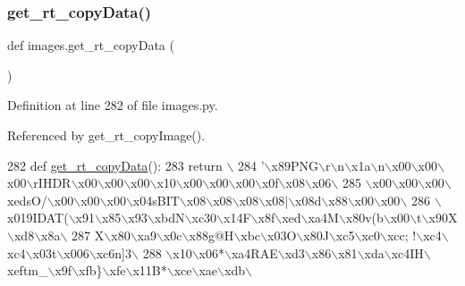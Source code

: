 \subsubsection{\texorpdfstring{get\+\_\+rt\+\_\+copy\+Data()}{get\_rt\_copyData()}}
{\footnotesize\ttfamily def images.\+get\+\_\+rt\+\_\+copy\+Data (\begin{DoxyParamCaption}{ }\end{DoxyParamCaption})}



Definition at line 282 of file images.\+py.



Referenced by get\+\_\+rt\+\_\+copy\+Image().


\begin{DoxyCode}
282 \textcolor{keyword}{def }\hyperlink{namespaceimages_ab5eacef04318a348f0c9e295ce5f6a64}{get\_rt\_copyData}():
283     \textcolor{keywordflow}{return} \(\backslash\)
284 \textcolor{stringliteral}{'\(\backslash\)x89PNG\(\backslash\)r\(\backslash\)n\(\backslash\)x1a\(\backslash\)n\(\backslash\)x00\(\backslash\)x00\(\backslash\)x00\(\backslash\)rIHDR\(\backslash\)x00\(\backslash\)x00\(\backslash\)x00\(\backslash\)x10\(\backslash\)x00\(\backslash\)x00\(\backslash\)x00\(\backslash\)x0f\(\backslash\)x08\(\backslash\)x06\(\backslash\)}
285 \textcolor{stringliteral}{\(\backslash\)x00\(\backslash\)x00\(\backslash\)x00\(\backslash\)xedsO/\(\backslash\)x00\(\backslash\)x00\(\backslash\)x00\(\backslash\)x04sBIT\(\backslash\)x08\(\backslash\)x08\(\backslash\)x08\(\backslash\)x08|\(\backslash\)x08d\(\backslash\)x88\(\backslash\)x00\(\backslash\)x00\(\backslash\)}
286 \textcolor{stringliteral}{\(\backslash\)x019IDAT(\(\backslash\)x91\(\backslash\)x85\(\backslash\)x93\(\backslash\)xbdN\(\backslash\)xc30\(\backslash\)x14F\(\backslash\)x8f\(\backslash\)xed\(\backslash\)xa4M\(\backslash\)x80v(b\(\backslash\)x00\(\backslash\)t\(\backslash\)x90X\(\backslash\)xd8\(\backslash\)x8a\(\backslash\)}
287 \textcolor{stringliteral}{X\(\backslash\)x80\(\backslash\)xa9\(\backslash\)x0c\(\backslash\)x88g@H\(\backslash\)xbc\(\backslash\)x03O\(\backslash\)x80J\(\backslash\)xc5\(\backslash\)xc0\(\backslash\)xcc; !\(\backslash\)xc4\(\backslash\)xc4\(\backslash\)x03t\(\backslash\)x006\(\backslash\)xc6n]3\(\backslash\)}
288 \textcolor{stringliteral}{\(\backslash\)x10\(\backslash\)x06*\(\backslash\)xa4RAE\(\backslash\)xd3\(\backslash\)x86\(\backslash\)x81\(\backslash\)xda\(\backslash\)xc4IH\(\backslash\)xeftm\_\(\backslash\)x9f\(\backslash\)xfb\}\(\backslash\)xfe\(\backslash\)x11B*\(\backslash\)xce\(\backslash\)xae\(\backslash\)xdb\(\backslash\)}

\end{DoxyCode}
